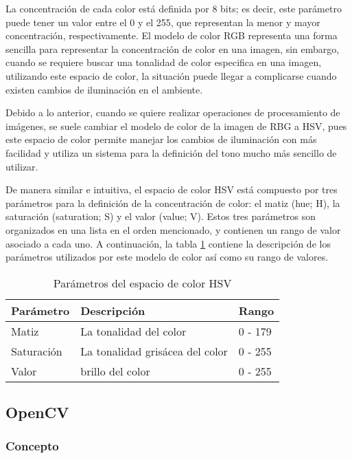 La concentración de cada color está definida por 8 bits; es decir, este parámetro puede tener un valor entre el 0 y el 255, que representan la menor y mayor concentración, respectivamente. El modelo de color RGB representa una forma sencilla para representar la concentración de color en una imagen, sin embargo, cuando se requiere buscar una tonalidad de color especifica en una imagen, utilizando este espacio de color, la situación puede llegar a complicarse cuando existen cambios de iluminación en el ambiente. 

Debido a lo anterior, cuando se quiere realizar operaciones de procesamiento de imágenes, se suele cambiar el modelo de color de la imagen de RBG a HSV, pues este espacio de color permite manejar los cambios de iluminación con más facilidad y utiliza un sistema para la definición del tono mucho más sencillo de utilizar. 

De manera similar e intuitiva, el espacio de color HSV está compuesto por tres parámetros para la definición de la concentración de color: el matiz (hue; H), la saturación (saturation; S) y el valor (value; V). Estos tres parámetros son organizados en una lista en el orden mencionado, y contienen un rango de valor asociado a cada uno. A continuación, la tabla \ref{tab:hsv_param} contiene la descripción de los parámetros utilizados por este modelo de color así como su rango de valores.

\begin{table}[ht]
    \centering
    \begin{tabular}{lll}
        \hline
        Parámetro & Descripción & Rango\\
        \hline \hline
        Matiz & La tonalidad del color & 0 - 179\\
        Saturación & La tonalidad grisácea del color & 0 - 255\\
        Valor & brillo del color & 0 - 255\\
        \hline \hline
    \end{tabular}
    \caption{Parámetros del espacio de color HSV}
    \label{tab:hsv_param}
\end{table}

\subsection{OpenCV}

\subsubsection{Concepto}


